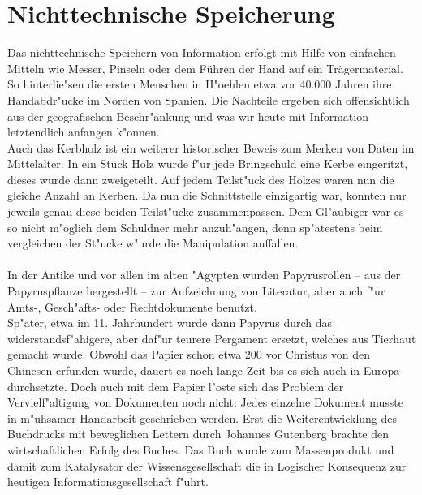 
\chapter{Nichttechnische Speicherung}
\label{ch:Nichttechnische Speicherung}
Das nichttechnische Speichern von Information erfolgt mit Hilfe von einfachen Mitteln wie Messer, Pinseln oder dem Führen der Hand auf ein Trägermaterial. So hinterlie"sen die ersten Menschen in H"oehlen etwa vor 40.000 Jahren ihre Handabdr"ucke im Norden von Spanien\cite{spiegel:hoehle}. Die Nachteile ergeben sich offensichtlich aus der geografischen Beschr"ankung und was wir heute mit Information letztendlich anfangen k"onnen.
\\
Auch das Kerbholz ist ein weiterer historischer Beweis zum Merken von Daten im Mittelalter. In ein Stück Holz wurde f"ur jede Bringschuld eine Kerbe eingeritzt, dieses wurde dann zweigeteilt. Auf jedem Teilst"uck des Holzes waren nun die gleiche Anzahl an Kerben. Da nun die Schnittstelle einzigartig war, konnten nur jeweils genau diese beiden Teilst"ucke zusammenpassen. Dem Gl"aubiger war es so nicht m"oglich dem Schuldner mehr anzuh"angen, denn sp"atestens beim vergleichen der St"ucke w"urde die Manipulation auffallen.\cite{carlen:kerbholz} 
\\
\\
In der Antike und vor allen im alten "Agypten wurden Papyrusrollen – aus der Papyruspflanze hergestellt – zur Aufzeichnung von Literatur, aber auch f"ur Amts-, Gesch"afts- oder Rechtdokumente benutzt. 
\\
Sp"ater, etwa im 11. Jahrhundert wurde dann Papyrus durch das widerstandsf"ahigere, aber daf"ur teurere Pergament ersetzt, welches aus Tierhaut gemacht wurde.
Obwohl das Papier schon etwa 200 vor Christus von den Chinesen erfunden wurde, dauert es noch lange Zeit bis es sich auch in Europa durchsetzte. Doch auch mit dem Papier l"oste sich das Problem der Vervielf"altigung von Dokumenten noch nicht: Jedes einzelne Dokument musste in m"uhsamer Handarbeit geschrieben werden. Erst die Weiterentwicklung des Buchdrucks mit beweglichen Lettern durch Johannes Gutenberg brachte den wirtschaftlichen Erfolg des Buches. Das Buch wurde zum Massenprodukt und damit zum Katalysator der Wissensgesellschaft die in Logischer Konsequenz zur heutigen Informationsgesellschaft f"uhrt.


